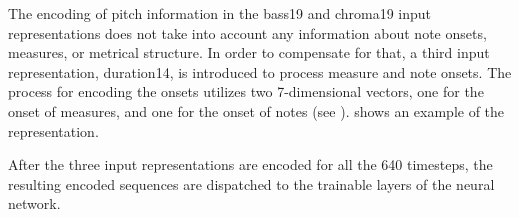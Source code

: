 
The encoding of pitch information in the \gls{bass19} and
\gls{chroma19} input representations does not take into
account any information about note onsets, measures, or
metrical structure. In order to compensate for that, a third
input representation, \gls{duration14}, is introduced to
process measure and note onsets. The process for encoding
the onsets utilizes two 7-dimensional vectors, one for the
onset of measures, and one for the onset of notes (see
).
 shows an example of the
representation.


After the three input representations are encoded for all
the 640 timesteps, the resulting encoded sequences are
dispatched to the trainable layers of the neural network.
